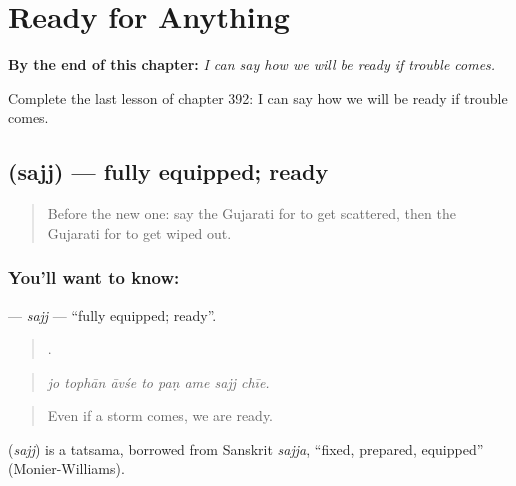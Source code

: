 
\chapter{Ready for Anything}
\label{ch:gu-ready-for-anything}

\begin{chapteropening}
\textbf{By the end of this chapter:} \emph{I can say how we will be ready if trouble comes.}

Complete the last lesson of chapter 392: I can say how we will be ready if trouble comes.
\end{chapteropening}

\section[\texorpdfstring{\gu{સજ્જ} (sajj)}{સજ્જ (sajj)}]{ (sajj) — fully equipped; ready}

\label{lesson:GU-C392-sajj}



\begin{quote}
Before the new one: say the Gujarati for to get scattered, then the Gujarati for to get wiped out.
\end{quote}

\subsection*{You'll want to know: }
\textbf{} — \emph{sajj} — \textquotedblleft{}fully equipped; ready\textquotedblright{}.

\begin{quote}
       .
\end{quote}

\begin{quote}
\emph{jo tophān āvśe to paṇ ame sajj chīe.}
\end{quote}

\begin{quote}
Even if a storm comes, we are ready.
\end{quote}

\begin{cousinweb}
\textbf{} (\emph{sajj}) is a tatsama, borrowed from Sanskrit \emph{sajja}, \textquotedblleft{}fixed, prepared, equipped\textquotedblright{} (Monier-Williams).
\end{cousinweb}

